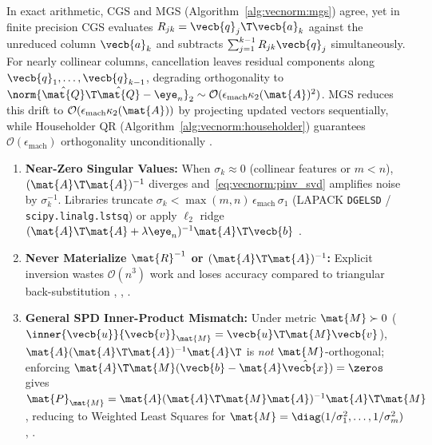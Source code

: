 \documentclass[../../../../master.tex]{subfiles}
\begin{document}
\begin{pitfall}
In exact arithmetic, CGS and MGS (Algorithm~\ref{alg:vecnorm:mgs}) agree, yet in finite precision CGS evaluates $R_{jk} = \vecb{q}_j\T\vecb{a}_k$ against the unreduced column $\vecb{a}_k$ and subtracts $\sum_{j=1}^{k-1} R_{jk}\vecb{q}_j$ simultaneously. For nearly collinear columns, cancellation leaves residual components along $\vecb{q}_1,\dots,\vecb{q}_{k-1}$, degrading orthogonality to $\norm{\hat{\mat{Q}}\T\hat{\mat{Q}} - \eye_n}_2 \sim \mathcal{O}(\epsilon_{\mathrm{mach}}\kappa_2(\mat{A})^2)$. MGS reduces this drift to $\mathcal{O}(\epsilon_{\mathrm{mach}}\kappa_2(\mat{A}))$ by projecting updated vectors sequentially, while Householder QR (Algorithm~\ref{alg:vecnorm:householder}) guarantees $\mathcal{O}(\epsilon_{\mathrm{mach}})$ orthogonality unconditionally .
\end{pitfall}

\begin{pitfall}
\begin{enumerate}[leftmargin=1.4em, itemsep=2pt, topsep=2pt]
  \item \textbf{Near-Zero Singular Values:} When $\sigma_k \approx 0$ (collinear features or $m < n$), $(\mat{A}\T\mat{A})^{-1}$ diverges and~\eqref{eq:vecnorm:pinv_svd} amplifies noise by $\sigma_k^{-1}$. Libraries truncate $\sigma_k < \max(m, n)\,\epsilon_{\mathrm{mach}}\,\sigma_1$ (LAPACK \texttt{DGELSD} / \texttt{scipy.linalg.lstsq}) or apply $\ell_2$ ridge $(\mat{A}\T\mat{A} + \lambda\eye_n)^{-1}\mat{A}\T\vecb{b}$ .
  \item \textbf{Never Materialize $\mat{R}^{-1}$ or $(\mat{A}\T\mat{A})^{-1}$:} Explicit inversion wastes $\mathcal{O}(n^3)$ work and loses accuracy compared to triangular back-substitution , , .
  \item \textbf{General SPD Inner-Product Mismatch:} Under metric $\mat{M} \succ 0$ ($\inner{\vecb{u}}{\vecb{v}}_{\mat{M}} = \vecb{u}\T\mat{M}\vecb{v}$), $\mat{A}(\mat{A}\T\mat{A})^{-1}\mat{A}\T$ is \emph{not} $\mat{M}$-orthogonal; enforcing $\mat{A}\T\mat{M}(\vecb{b} - \mat{A}\hat{\vecb{x}}) = \zeros$ gives $\mat{P}_{\mat{M}} = \mat{A}(\mat{A}\T\mat{M}\mat{A})^{-1}\mat{A}\T\mat{M}$, reducing to Weighted Least Squares for $\mat{M} = \diag(1/\sigma_1^2, \dots, 1/\sigma_m^2)$ , .
\end{enumerate}
\end{pitfall}
\end{document}
